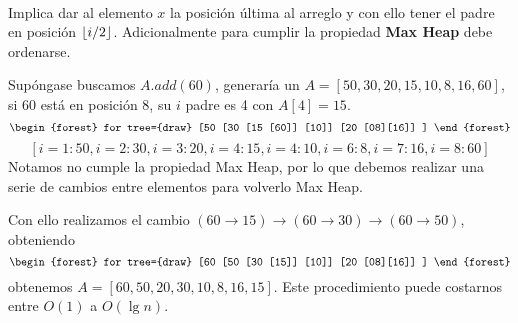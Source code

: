 \documentclass[tikz,11pt,fleqn]{book} %
\begin{document}
\begin{theorem}~\\
    Implica dar al elemento $x$ la posición última al arreglo y con ello tener el padre en posición $\left\lfloor i/2 \right\rfloor$.
    Adicionalmente para cumplir la propiedad \textbf{Max Heap} debe ordenarse.

    Supóngase buscamos $A.add(60)$, generaría un $A=[50,30,20,15,10,8,16,60]$, si 60 está en posición 8, su $i$ padre es 4 con $A[4]=15$.
    $$\begin{forest}
    for tree={draw}
        [50
            [30
                [15
                    [60]]
                [10]]
            [20
                [08][16]]
        ]
    \end{forest}$$
    $$
    [i=1:50,i=2:30,i=3:20,i=4:15,i=4:10,i=6:8,i=7:16,i=8:60]
    $$
    Notamos no cumple la propiedad Max Heap, por lo que debemos realizar una serie de cambios entre elementos para volverlo Max Heap.

    Con ello realizamos el cambio $(60\to15)\to(60\to30)\to(60\to50)$, obteniendo
    $$\begin{forest}
    for tree={draw}
        [60
            [50
                [30
                    [15]]
                [10]]
            [20
                [08][16]]
        ]
    \end{forest}$$
    obtenemos $A=[60,50,20,30,10,8,16,15]$. Este procedimiento puede costarnos entre $O(1)$ a $O(\lg n)$. 
\end{theorem}
\end{document}
